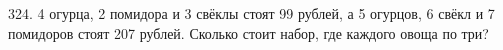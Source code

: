 324. 4 огурца, 2 помидора и 3 свёклы стоят 99 рублей, а 5 огурцов, 6 свёкл и 7 помидоров стоят 207 рублей. Сколько стоит набор, где каждого овоща по три?\\
